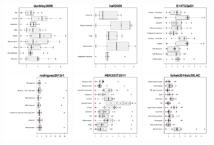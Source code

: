 \documentclass[12pt]{article}\usepackage[]{graphicx}\usepackage[]{color}
\begin{document}
\begin{appendices}
\begin{figure}[htb]
  \includegraphics[width = 0.32\textwidth]{./figure/allqseps-17.pdf}
  \includegraphics[width = 0.32\textwidth]{./figure/allqseps-18.pdf}
  \includegraphics[width = 0.32\textwidth]{./figure/allqseps-19.pdf}
  \includegraphics[width = 0.32\textwidth]{./figure/allqseps-20.pdf}
  \includegraphics[width = 0.32\textwidth]{./figure/allqseps-21.pdf}
  \includegraphics[width = 0.32\textwidth]{./figure/allqseps-22.pdf}

\end{figure}
\end{appendices}
\end{document}
